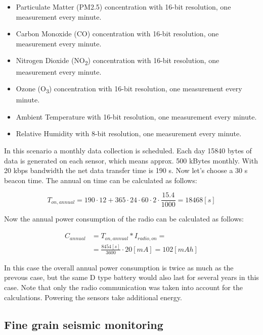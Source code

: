 \documentclass[conference]{IEEEtran}
\begin{document}
\begin{itemize}
	\item{Particulate Matter (PM2.5) concentration with 16-bit resolution, one measurement every minute.}
	\item{Carbon Monoxide (CO) concentration with 16-bit resolution, one measurement every minute.}
  \item{Nitrogen Dioxide (NO\textsubscript{2}) concentration with 16-bit resolution, one measurement every minute.}
  \item{Ozone (O\textsubscript{3}) concentration with 16-bit resolution, one measurement every minute.}
	\item{Ambient Temperature with 16-bit resolution, one measurement every minute.}
	\item{Relative Humidity with 8-bit resolution, one measurement every minute.}
\end{itemize}

In this scenario a monthly data collection is scheduled. Each day 15840 bytes of data
is generated on each sensor, which means approx. 500 kBytes monthly. With 20 kbps
bandwidth the net data transfer time is 190 s. Now let's choose a 30 s beacon time.
The annual on time can be calculated as follows:

\begin{equation}
    T_{on,annual} = 190 \cdot 12 + 365 \cdot 24 \cdot 60 \cdot 2 \cdot \frac{15.4}{1000} = 18468 [s]
\end{equation}

Now the annual power consumption of the radio can be calculated as
follows:

\begin{align}
    C_{annual} &= T_{on,annual} * I_{radio,on} = \\
     &= \frac{8454 [s]}{3600} \cdot 20 [mA] = 102 [mAh]
\end{align}

In this case the overall annual power consumption is twice as much as the
prevous case, but the same D type battery would also last for several years 
in this case. Note that only the radio communication was taken into account
for the calculations. Powering the sensors take additional energy.

\subsection{Fine grain seismic monitoring}
\end{document}
